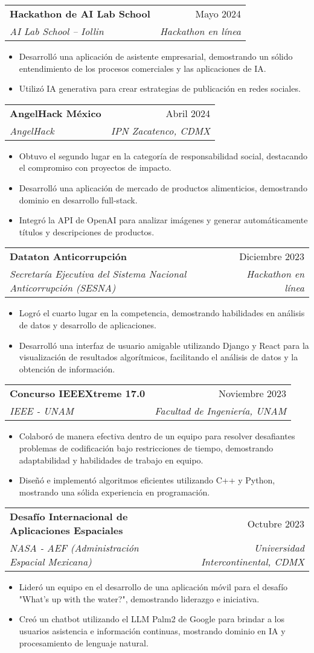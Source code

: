 \documentclass[letterpaper,11pt]{article}
\makeatletter
\newcommand{\resumeItem}[1]{
  \item\small{
    {#1 \vspace{-2pt}}
  }
}
\newcommand{\resumeSubheading}[4]{
  \vspace{-2pt}\item
    \begin{tabular*}{0.97\textwidth}[t]{l@{\extracolsep{\fill}}r}
      \textbf{#1} & #2 \\
      \textit{\small#3} & \textit{\small #4} \\
    \end{tabular*}\vspace{-7pt}
}
\newcommand{\resumeItemListStart}{\begin{itemize}}
\newcommand{\resumeItemListEnd}{\end{itemize}\vspace{-5pt}}
\makeatother
\begin{document}
\resumeSubheading
{Hackathon de AI Lab School}{Mayo 2024}
{AI Lab School -- Iollin}{Hackathon en línea}
\resumeItemListStart
\resumeItem{Desarrolló una aplicación de asistente empresarial, demostrando un sólido entendimiento de los procesos comerciales y las aplicaciones de IA.}
\resumeItem{Utilizó IA generativa para crear estrategias de publicación en redes sociales.}
\resumeItemListEnd

\resumeSubheading
{AngelHack México}{Abril 2024}
{AngelHack}{IPN Zacatenco, CDMX}
\resumeItemListStart
\resumeItem{Obtuvo el segundo lugar en la categoría de responsabilidad social, destacando el compromiso con proyectos de impacto.}
\resumeItem{Desarrolló una aplicación de mercado de productos alimenticios, demostrando dominio en desarrollo full-stack.}
\resumeItem{Integró la API de OpenAI para analizar imágenes y generar automáticamente títulos y descripciones de productos.}
\resumeItemListEnd

\resumeSubheading
{Dataton Anticorrupción}{Diciembre 2023}
{Secretaría Ejecutiva del Sistema Nacional Anticorrupción (SESNA)}{Hackathon en línea}
\resumeItemListStart
\resumeItem{Logró el cuarto lugar en la competencia, demostrando habilidades en análisis de datos y desarrollo de aplicaciones.}
\resumeItem{Desarrolló una interfaz de usuario amigable utilizando Django y React para la visualización de resultados algorítmicos, facilitando el análisis de datos y la obtención de información.}
\resumeItemListEnd

\resumeSubheading
{Concurso IEEEXtreme 17.0}{Noviembre 2023}
{IEEE - UNAM}{Facultad de Ingeniería, UNAM}
\resumeItemListStart
\resumeItem{Colaboró de manera efectiva dentro de un equipo para resolver desafiantes problemas de codificación bajo restricciones de tiempo, demostrando adaptabilidad y habilidades de trabajo en equipo.}
\resumeItem{Diseñó e implementó algoritmos eficientes utilizando C++ y Python, mostrando una sólida experiencia en programación.}
\resumeItemListEnd

\resumeSubheading
{Desafío Internacional de Aplicaciones Espaciales}{Octubre 2023}
{NASA - AEF (Administración Espacial Mexicana)}{Universidad Intercontinental, CDMX}
\resumeItemListStart
\resumeItem{Lideró un equipo en el desarrollo de una aplicación móvil para el desafío "What's up with the water?", demostrando liderazgo e iniciativa.}
\resumeItem{Creó un chatbot utilizando el LLM Palm2 de Google para brindar a los usuarios asistencia e información continuas, mostrando dominio en IA y procesamiento de lenguaje natural.}
\resumeItemListEnd
\end{document}
